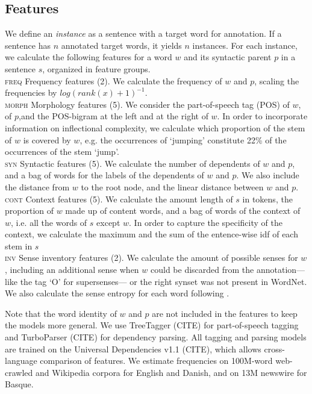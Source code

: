 \documentclass[11pt,a4paper]{article}
\begin{document}
\subsection{Features}
We define an \textit{instance} as a sentence with a target word for annotation. If a sentence has $n$ annotated target words, it yields $n$ instances. For each instance, we calculate the following features for a word $w$ and its syntactic parent $p$ in a sentence $s$, organized in feature groups.\\ 
\noindent\textsc{freq} Frequency features (2). We calculate the frequency of $w$ and $p$, scaling the frequencies by $log(rank(x)+1)^{-1}$.\\
\textsc{morph} Morphology features (5). We consider the part-of-speech tag (POS) of $w$, of $p$,and the POS-bigram at the left and at the right of $w$. In order to incorporate information on inflectional complexity, we calculate which proportion of the stem of $w$ is covered by $w$, e.g. the occurrences of `jumping' constitute 22\% of the occurrences of the stem `jump'. \\
\textsc{syn} Syntactic features (5). We calculate the number of dependents of $w$ and $p$, and a bag of words for the labels of the dependents of $w$ and $p$. We also include the distance from $w$ to the root node, and the linear distance between $w$ and $p$.\\
\textsc{cont} Context features (5). We calculate the amount length of $s$ in tokens, the proportion of $w$ made up of content words, and a bag of words of the context of $w$, i.e. all the words of $s$ except $w$. In order to capture the specificity of the context, we calculate the maximum and the sum of the entence-wise idf of each stem in $s$ \\
\textsc{inv} Sense inventory features (2). We calculate the amount of possible senses for $w$, including an additional sense when $w$ could be discarded from the annotation---like the tag `O' for supersenses--- or the right synset was not present in WordNet. We also calculate the sense entropy for each word following . 

Note that the word identity of $w$ and $p$ are not included in the features to keep the models more general. We use TreeTagger (CITE) for part-of-speech tagging and TurboParser (CITE) for dependency parsing. All tagging and parsing models are trained on the Universal Dependencies v1.1 (CITE), which allows cross-language comparison of features. We estimate frequencies on 100M-word web-crawled and Wikipedia corpora for English and Danish, and on 13M newswire for Basque.
\end{document}

